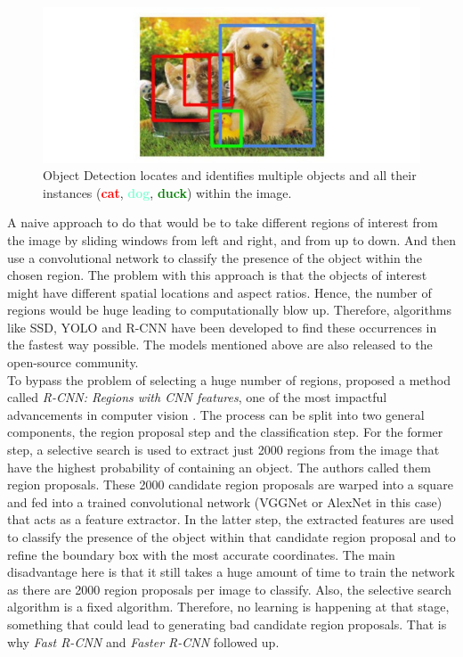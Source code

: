 \documentclass[12pt,a4paper,table,dvipsnames,tikz]{report}
\newcommand{\term}{\textit}
\newcommand{\acronym}{\MakeUppercase}
\newcommand{\boldcolor}[2]{\textbf{\textcolor{#1}{#2}}}
\begin{document}
	\begin{figure}[h!]
		\centering
		\includegraphics[width=\textwidth]{detect}
		\caption{Object Detection locates and identifies multiple objects and all their 
			instances (\boldcolor{red}{cat}, \boldcolor{Aquamarine}{dog}, \boldcolor{green}{duck}) 
			within the image.}
		\label{fig:det}
	\end{figure}
	
	A naive approach to do that would be to take different regions of interest from the 
	image by sliding windows from left and right, and from up to down. And then use a 
	convolutional network to classify the presence of the object within the chosen region. 
	The problem with this approach is that the objects of interest might have different 
	spatial locations and aspect ratios. Hence, the number of regions would be huge leading 
	to computationally blow up. Therefore, algorithms like \acronym{ssd}, \acronym{yolo} 
	and \acronym{r-cnn} \citep{Girshick, Redmon, Liu} have been developed to find these 
	occurrences in the fastest way possible. The models mentioned above are also released 
	to the open-source community.
	\\
	
	To bypass the problem of selecting a huge number of regions, \citet{Girshick} proposed 
	a method called \term{\acronym{r-cnn}: Regions with \acronym{cnn} features}, one of the 
	most impactful advancements in computer vision \citep{Deshpande}. The process can be 
	split into two general components, the region proposal step and the classification step. 
	For the former step, a selective search \citep{Uijlings} is used to extract just 2000 
	regions from the image that have the highest probability of containing an object. The 
	authors called them region proposals. These 2000 candidate region proposals are warped 
	into a square and fed into a trained convolutional network (VGGNet or AlexNet in this case) 
	that acts as a feature extractor. In the latter step, the extracted features are used to 
	classify the presence of the object within that candidate region proposal and to refine 
	the boundary box with the most accurate coordinates. The main disadvantage here is that 
	it still takes a huge amount of time to train the network as there are 2000 region proposals 
	per image to classify. Also, the selective search algorithm is a fixed algorithm. Therefore, 
	no learning is happening at that stage, something that could lead to generating bad 
	candidate region proposals. That is why \term{Fast \acronym{r-cnn}} and 
	\term{Faster \acronym{r-cnn}} followed up.
	\\
	
\end{document}
